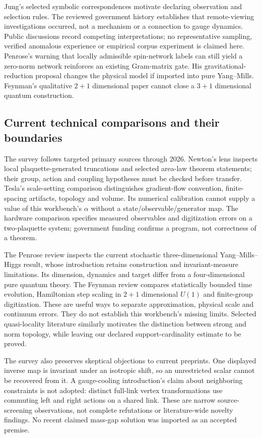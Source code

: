 \documentclass[11pt,a4paper]{article}
\begin{document}
Jung's selected symbolic correspondences motivate declaring observation and selection rules. The reviewed government history establishes that remote-viewing investigations occurred, not a mechanism or a connection to gauge dynamics. Public discussions record competing interpretations; no representative sampling, verified anomalous experience or empirical corpus experiment is claimed here. Penrose's warning that locally admissible spin-network labels can still yield a zero-norm network reinforces an existing Gram-matrix gate. His gravitational-reduction proposal changes the physical model if imported into pure Yang--Mills. Feynman's qualitative $2+1$ dimensional paper cannot close a $3+1$ dimensional quantum construction.

\subsection{Current technical comparisons and their boundaries}
The survey follows targeted primary sources through 2026. Newton's lens inspects local plaquette-generated truncations and selected area-law theorem statements; their group, action and coupling hypotheses must be checked before transfer. Tesla's scale-setting comparison distinguishes gradient-flow convention, finite-spacing artifacts, topology and volume. Its numerical calibration cannot supply a value of this workbench's $\alpha$ without a state/observable/generator map. The hardware comparison specifies measured observables and digitization errors on a two-plaquette system; government funding confirms a program, not correctness of a theorem.

The Penrose review inspects the current stochastic three-dimensional Yang--Mills--Higgs result, whose introduction retains construction and invariant-measure limitations. Its dimension, dynamics and target differ from a four-dimensional pure quantum theory. The Feynman review compares statistically bounded time evolution, Hamiltonian step scaling in $2+1$ dimensional $U(1)$ and finite-group digitization. These are useful ways to separate approximation, physical scale and continuum errors. They do not establish this workbench's missing limits. Selected quasi-locality literature similarly motivates the distinction between strong and norm topology, while leaving our declared support-cardinality estimate to be proved.

The survey also preserves skeptical objections to current preprints. One displayed inverse map is invariant under an isotropic shift, so an unrestricted scalar cannot be recovered from it. A gauge-cooling introduction's claim about neighboring constraints is not adopted: distinct full-link vertex transformations use commuting left and right actions on a shared link. These are narrow source-screening observations, not complete refutations or literature-wide novelty findings. No recent claimed mass-gap solution was imported as an accepted premise.
\end{document}

